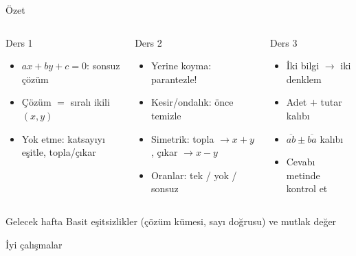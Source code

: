 \documentclass[aspectratio=169,11pt,handout]{beamer}
\newcommand{\ab}[1]{\overline{#1}}
\begin{document}
\begin{frame}{Özet}
\begin{columns}[t]
\begin{block}{Ders 1}
\begin{itemize}
\item \(ax+by+c=0\): sonsuz çözüm
\item Çözüm \(=\) sıralı ikili \((x,y)\)
\item Yok etme: katsayıyı eşitle, topla/çıkar
\end{itemize}
\end{block}
\begin{block}{Ders 2}
\begin{itemize}
\item Yerine koyma: parantezle!
\item Kesir/ondalık: önce temizle
\item Simetrik: topla \(\to x+y\), çıkar \(\to x-y\)
\item Oranlar: tek / yok / sonsuz
\end{itemize}
\end{block}
\begin{block}{Ders 3}
\begin{itemize}
\item İki bilgi \(\to\) iki denklem
\item Adet \(+\) tutar kalıbı
\item \(\ab{ab}\pm\ab{ba}\) kalıbı
\item Cevabı metinde kontrol et
\end{itemize}
\end{block}
\end{columns}
\vspace{6pt}
\begin{alertblock}{Gelecek hafta}
Basit eşitsizlikler (çözüm kümesi, sayı doğrusu) ve mutlak değer
\end{alertblock}
\end{frame}

\begin{frame}
\centering\Large İyi çalışmalar
\end{frame}
\end{document}
